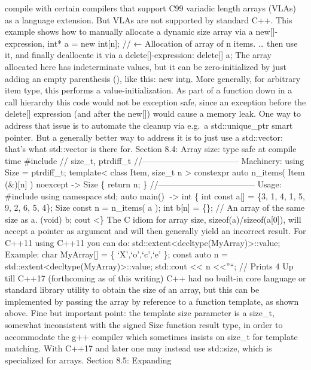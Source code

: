 compile with certain compilers that support C99 variadic length arrays
(VLAs) as a language extension. But VLAs are not supported by standard
C++. This example shows how to manually allocate a dynamic size array
via a new{[}{]}-expression, int* a = new int{[}n{]}; // ← Allocation of
array of n items. \ldots{} then use it, and ﬁnally deallocate it via a
delete{[}{]}-expression: delete{[}{]} a; The array allocated here has
indeterminate values, but it can be zero-initialized by just adding an
empty parenthesis (), like this: new int\href{}{n}. More generally, for
arbitrary item type, this performs a value-initialization. As part of a
function down in a call hierarchy this code would not be exception safe,
since an exception before the delete{[}{]} expression (and after the
new{[}{]}) would cause a memory leak. One way to address that issue is
to automate the cleanup via e.g.~a std::unique\_ptr smart pointer. But a
generally better way to address it is to just use a std::vector: that's
what std::vector is there for. Section 8.4: Array size: type safe at
compile time \#include // size\_t, ptrdiff\_t
//----------------------------------- Machinery: using Size =
ptrdiff\_t; template\textless{} class Item, size\_t n \textgreater{}
constexpr auto n\_items( Item (\&){[}n{]} ) noexcept -\textgreater{}
Size \{ return n; \} //----------------------------------- Usage:
\#include using namespace std; auto main() -\textgreater{} int \{ int
const a{[}{]} = \{3, 1, 4, 1, 5, 9, 2, 6, 5, 4\}; Size const n =
n\_items( a ); int b{[}n{]} = \{\}; // An array of the same size as a.
(void) b; cout \textless\} The C idiom for array size,
sizeof(a)/sizeof(a{[}0{]}), will accept a pointer as argument and will
then generally yield an incorrect result. For C++11 using C++11 you can
do: std::extent\textless decltype(MyArray)\textgreater::value; Example:
char MyArray{[}{]} = \{ `X',`o',`c',`e' \}; const auto n =
std::extent\textless decltype(MyArray)\textgreater::value; std::cout
\textless\textless{} n \textless\textless{}''\n``; // Prints 4 Up till
C++17 (forthcoming as of this writing) C++ had no built-in core language
or standard library utility to obtain the size of an array, but this can
be implemented by passing the array by reference to a function template,
as shown above. Fine but important point: the template size parameter is
a size\_t, somewhat inconsistent with the signed Size function result
type, in order to accommodate the g++ compiler which sometimes insists
on size\_t for template matching. With C++17 and later one may instead
use std::size, which is specialized for arrays. Section 8.5: Expanding
